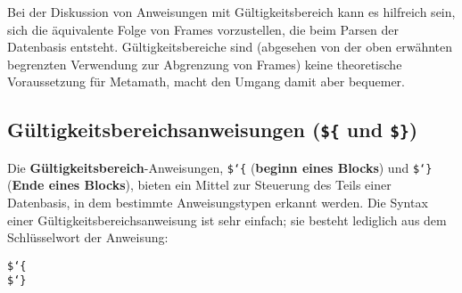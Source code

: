 Bei der Diskussion von Anweisungen mit Gültigkeitsbereich kann es hilfreich sein, sich die äquivalente Folge von Frames vorzustellen, die beim Parsen der Datenbasis entsteht.  Gültigkeitsbereiche sind (abgesehen von der oben erwähnten begrenzten Verwendung zur Abgrenzung von Frames) keine theoretische Voraussetzung für Metamath, macht den Umgang damit aber bequemer.

\subsection{Gültigkeitsbereichsanweisungen (\texttt{\$\{} und \texttt{\$\}})}\label{scoping}


Die {\bf Gültigkeitsbereich}-Anweisungen, \texttt{\$\char`\{} ({\bf beginn eines Blocks}) und \texttt{\$\char`\}} ({\bf Ende eines Blocks}), bieten ein Mittel zur Steuerung des Teils einer Datenbasis, in dem bestimmte Anweisungstypen erkannt werden.  Die Syntax einer Gültigkeitsbereichsanweisung ist sehr einfach; sie besteht lediglich aus dem Schlüsselwort der Anweisung:
\begin{center}
\texttt{\$\char`\{}\\
\texttt{\$\char`\}}
\end{center}

